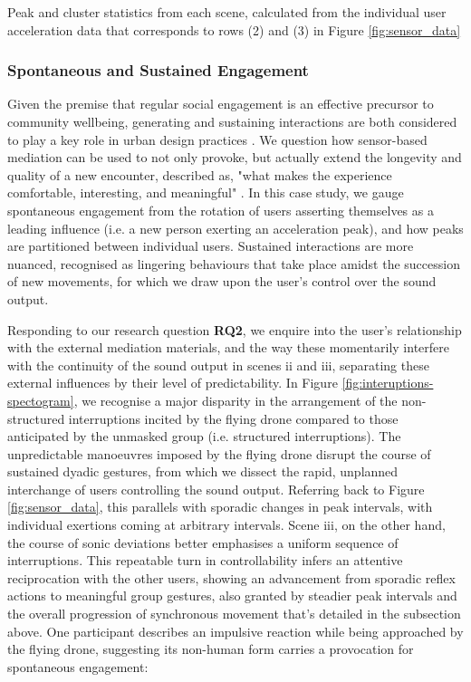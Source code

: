 \begin{table}[!h]

\caption[Peak and cluster statistics from each scene]{Peak and cluster statistics from each scene, calculated from the individual user acceleration data that corresponds to rows (2) and (3) in Figure \ref{fig:sensor_data}}
\label{table:cluster_table}
\end{table}

\subsubsection{Spontaneous and Sustained Engagement}

Given the premise that regular social engagement is an effective precursor to community wellbeing, generating and sustaining interactions are both considered to play a key role in urban design practices \citep{latham_social_2019,okkels_urban_2018,mehta_look_2009}. We question how sensor-based mediation can be used to not only provoke, but actually extend the longevity and quality of a new encounter, described as, "what makes the experience comfortable, interesting, and meaningful" \citep{mehta_look_2009}. In this case study, we gauge spontaneous engagement from the rotation of users asserting themselves as a leading influence (i.e. a new person exerting an acceleration peak), and how peaks are partitioned between individual users. Sustained interactions are more nuanced, recognised as lingering behaviours that take place amidst the succession of new movements, for which we draw upon the user's control over the sound output.

Responding to our research question \textbf{RQ2}, we enquire into the user's relationship with the external mediation materials, and the way these momentarily interfere with the continuity of the sound output in scenes ii and iii, separating these external influences by their level of predictability. In Figure \ref{fig:interuptions-spectogram}, we recognise a major disparity in the arrangement of the non-structured interruptions incited by the flying drone compared to those anticipated by the unmasked group (i.e. structured interruptions). The unpredictable manoeuvres imposed by the flying drone disrupt the course of sustained dyadic gestures, from which we dissect the rapid, unplanned interchange of users controlling the sound output. Referring back to Figure \ref{fig:sensor_data}, this parallels with sporadic changes in peak intervals, with individual exertions coming at arbitrary intervals. Scene iii, on the other hand, the course of sonic deviations better emphasises a uniform sequence of interruptions. This repeatable turn in controllability infers an attentive reciprocation with the other users, showing an advancement from sporadic reflex actions to meaningful group gestures, also granted by steadier peak intervals and the overall progression of synchronous movement that's detailed in the subsection above. One participant describes an impulsive reaction while being approached by the flying drone, suggesting its non-human form carries a provocation for spontaneous engagement:

